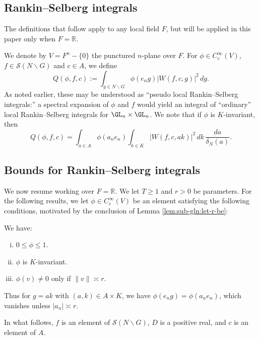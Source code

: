 \subsection{Rankin--Selberg integrals}\label{sec:rank-selb-integr}
The definitions that follow apply to any local field $F$, but will be applied in this paper only when $F = \mathbb{R}$.

We denote by $V = F^{n} - \{0\}$ the punctured $n$-plane over $F$.  For $\phi \in C_c^\infty(V)$, $f \in \mathcal{S}(N \backslash G)$ and $c \in A$, we define
\begin{equation*}
  Q(\phi,f,c) := \int_{g \in N \backslash G}
  \phi(e_n g) |W(f,c,g)|^2 \, d g.
\end{equation*}
As noted earlier, these may be understood as ``pseudo local Rankin--Selberg integrals:'' a spectral expansion of $\phi$ and $f$ would yield an integral of ``ordinary'' local Rankin--Selberg integrals for $\GL_n \times \GL_n$.  We note that if $\phi$ is $K$-invariant, then
\begin{equation*}
  Q(\phi,f,c) =
  \int_{a \in A}
  \phi(a_n e_n)
  \int_{k \in K}
  |W(f,c,a k)|^2 \, d k \, \frac{d a}{\delta_N(a)}.
\end{equation*}

\subsection{Bounds for Rankin--Selberg integrals}\label{sec:bounds-at-real-1}
We now resume working over $F = \mathbb{R}$.  We let $T \geq 1$ and $r > 0$ be parameters.  For the following results, we let $\phi \in C_c^\infty(V)$ be an element satisfying the following conditions, motivated by the conclusion of Lemma \ref{lem:sub-gln:let-r-be}:
\begin{assumptions}\label{sec:bounds-at-real-assumptions-phi}
  We have:
  \begin{enumerate}[(i)]
  \item $0 \leq \phi \leq 1$.
  \item $\phi$ is $K$-invariant.
  \item $\phi(v) \neq 0$ only if $\|v\| \asymp r$.
  \end{enumerate}
\end{assumptions}
Thus for $g = a k$ with $(a,k) \in A \times K$, we have $\phi(e_n g) = \phi(a_n e_n)$, which vanishes unless $|a_n| \asymp r$.

In what follows, $f$ is an element of $\mathcal{S}(N \backslash G)$, $D$ is a positive real, and $c$ is an element of $A$.

